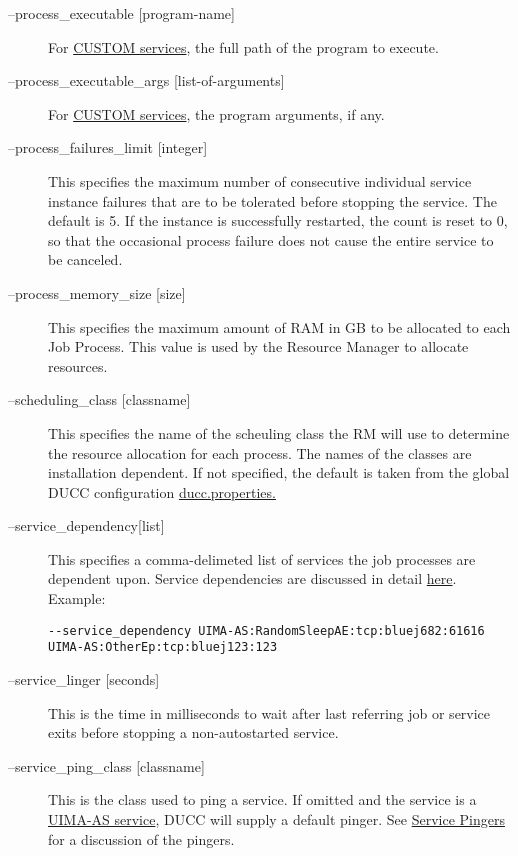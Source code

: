 \begin{description}
      \item[--process\_executable {[program-name]}] For \hyperref[sec:services.types]{CUSTOM
          services}, the full path of the program to execute.

      \item[--process\_executable\_args {[list-of-arguments]}] For \hyperref[sec:services.types]{CUSTOM
          services}, the program arguments, if any.

      \item[--process\_failures\_limit {[integer]}] 
        This specifies the maximum number of consecutive individual service instance failures that are to be 
        tolerated before stopping the service. The default is 5. If the instance is successfully
        restarted, the count is reset to 0, so that the occasional process failure does not cause
        the entire service to be canceled.
        
      \item[--process\_memory\_size {[size]}] This specifies the maximum amount of RAM in GB to be
        allocated to each Job Process.  This value is used by the Resource Manager to allocate
        resources. 

      \item[--scheduling\_class {[classname]}] This specifies the name of the scheuling class the RM
        will use to determine the resource allocation for each process. The names of the classes are
        installation dependent. If not specified, the default is taken from the global DUCC
        configuration \hyperref[sec:ducc.properties]{ducc.properties.}

      \item[--service\_dependency{[list]}] This specifies a comma-delimeted list of services the job
        processes are dependent upon. Service dependencies are discussed in detail
        \hyperref[sec:service.endpoints]{here}. Example:
\begin{verbatim}
--service_dependency UIMA-AS:RandomSleepAE:tcp:bluej682:61616 UIMA-AS:OtherEp:tcp:bluej123:123 
\end{verbatim}

      \item[--service\_linger {[seconds]}] This is the time in milliseconds to wait after last
        referring job or service exits before stopping a non-autostarted service.

      \item[--service\_ping\_class {[classname]}] This is the class used to ping a service. If
        omitted and the service is a \hyperref[sec:services.types]{UIMA-AS service}, DUCC will
        supply a default pinger.  See \hyperref[sec:service.pingers]{Service Pingers} for a
        discussion of the pingers.


\end{description}
